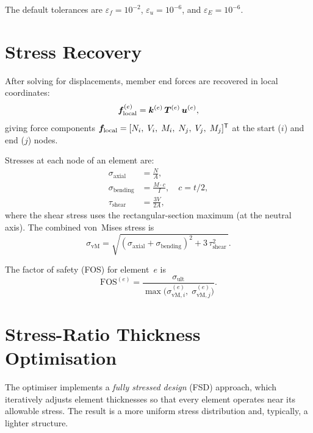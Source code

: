 The default tolerances are $\varepsilon_f = 10^{-2}$,
$\varepsilon_u = 10^{-6}$, and $\varepsilon_E = 10^{-6}$.

\section{Stress Recovery}
\label{sec:stress}

After solving for displacements, member end forces are recovered in local
coordinates:
%
\begin{equation}
    \bm{f}_{\text{local}}^{(e)} = \bm{k}^{(e)}\, \bm{T}^{(e)}\, \bm{u}^{(e)},
\end{equation}
%
giving force components
$\bm{f}_{\text{local}} = [N_i,\; V_i,\; M_i,\; N_j,\; V_j,\; M_j]^{\mathsf{T}}$
at the start ($i$) and end ($j$) nodes.

Stresses at each node of an element are:
%
\begin{align}
    \sigma_{\text{axial}}   &= \frac{N}{A}, \\[3pt]
    \sigma_{\text{bending}} &= \frac{M \cdot c}{I}, \quad c = t/2, \\[3pt]
    \tau_{\text{shear}}     &= \frac{3V}{2A},
\end{align}
%
where the shear stress uses the rectangular-section maximum (at the neutral
axis).  The combined von~Mises stress is
%
\begin{equation}
    \sigma_{\text{vM}} = \sqrt{(\sigma_{\text{axial}} + \sigma_{\text{bending}})^2
    + 3\,\tau_{\text{shear}}^2\,}.
\end{equation}

The factor of safety (FOS) for element~$e$ is
%
\begin{equation}
    \text{FOS}^{(e)} = \frac{\sigma_{\text{ult}}}
    {\max\!\big(\sigma_{\text{vM},i}^{(e)},\; \sigma_{\text{vM},j}^{(e)}\big)}.
\end{equation}

\section{Stress-Ratio Thickness Optimisation}
\label{sec:optimisation}

The optimiser implements a \emph{fully stressed design} (FSD) approach, which
iteratively adjusts element thicknesses so that every element operates near
its allowable stress.  The result is a more uniform stress distribution and,
typically, a lighter structure.

